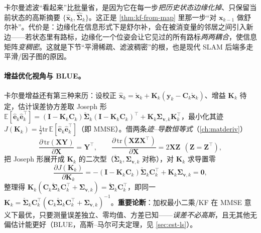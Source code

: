 \begin{insight}[滤波 $=$ 边缘化历史]
卡尔曼滤波“看起来”比批量省，是因为它在每一步\emph{把历史状态边缘化掉}、只保留当前状态的高斯摘要 $\{\hat{\mathbf{x}}_k,\hat{\boldsymbol{\Sigma}}_k\}$。这正是 \cref{thm:kf-from-map} 里那一步“对 $\mathbf{x}_{k-1}$ 做舒尔补”。代价是：边缘化在信息形式下是舒尔补，会在被消变量的邻居之间引入新边——若状态里有路标，边缘化一个位姿会让它见过的所有路标\emph{两两耦合}，使信息矩阵\emph{变稠密}。这就是下节“平滑稀疏、滤波稠密”的根，也是现代 SLAM 后端多走平滑/因子图的原因。
\end{insight}

\paragraph{增益优化视角与 BLUE。}
卡尔曼增益还有第三种来历\cite{barfoot2024state}：设校正 $\hat{\mathbf{x}}_k=\check{\mathbf{x}}_k+\mathbf{K}_k(\mathbf{y}_k-\mathbf{C}_k\check{\mathbf{x}}_k)$、增益 $\mathbf{K}_k$ 待定，估计误差协方差取 Joseph 形 $\mathbb{E}[\hat{\mathbf{e}}_k\hat{\mathbf{e}}_k^\top]=(\mathbf{I}-\mathbf{K}_k\mathbf{C}_k)\check{\boldsymbol{\Sigma}}_k(\mathbf{I}-\mathbf{K}_k\mathbf{C}_k)^\top+\mathbf{K}_k\boldsymbol{\Sigma}_{\mathbf{v},k}\mathbf{K}_k^\top$，最小化其迹 $J(\mathbf{K}_k)=\tfrac12\mathrm{tr}\,\mathbb{E}[\hat{\mathbf{e}}_k\hat{\mathbf{e}}_k^\top]$（即 MMSE）。借两条\emph{迹–导数恒等式}（\cref{ch:matderiv}）
\begin{equation}
  \frac{\partial\,\mathrm{tr}(\mathbf{X}\mathbf{Y})}{\partial\mathbf{X}}=\mathbf{Y}^\top,\qquad
  \frac{\partial\,\mathrm{tr}(\mathbf{X}\mathbf{Z}\mathbf{X}^\top)}{\partial\mathbf{X}}=2\mathbf{X}\mathbf{Z}\ \ (\mathbf{Z}=\mathbf{Z}^\top),
  \label{eq:trace-deriv}
\end{equation}
把 Joseph 形展开成 $\mathbf{K}_k$ 的二次型（$\check{\boldsymbol{\Sigma}}_k,\boldsymbol{\Sigma}_{\mathbf{v},k}$ 对称），对 $\mathbf{K}_k$ 求导置零
\begin{equation}
  \frac{\partial J(\mathbf{K}_k)}{\partial\mathbf{K}_k}=-(\mathbf{I}-\mathbf{K}_k\mathbf{C}_k)\check{\boldsymbol{\Sigma}}_k\mathbf{C}_k^\top+\mathbf{K}_k\boldsymbol{\Sigma}_{\mathbf{v},k}=\mathbf{0},
  \label{eq:gain-stationary}
\end{equation}
整理得 $\mathbf{K}_k(\mathbf{C}_k\check{\boldsymbol{\Sigma}}_k\mathbf{C}_k^\top+\boldsymbol{\Sigma}_{\mathbf{v},k})=\check{\boldsymbol{\Sigma}}_k\mathbf{C}_k^\top$，即同一 $\mathbf{K}_k=\check{\boldsymbol{\Sigma}}_k\mathbf{C}_k^\top(\mathbf{C}_k\check{\boldsymbol{\Sigma}}_k\mathbf{C}_k^\top+\boldsymbol{\Sigma}_{\mathbf{v},k})^{-1}$。\textbf{重要论断}：加权最小二乘/KF 在 MMSE 意义下最优，只要测量误差独立、零均值、方差已知——\emph{误差不必高斯}，且无其他无偏估计能更好（BLUE，高斯–马尔可夫定理，见 \cref{sec:est-ls}）。

